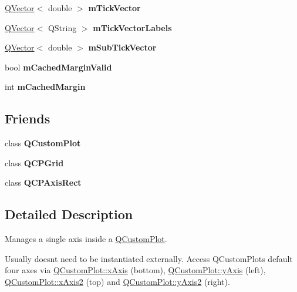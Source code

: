 \begin{DoxyCompactItemize}
\hyperlink{class_q_vector}{Q\+Vector}$<$ double $>$ {\bfseries m\+Tick\+Vector}
\item 
\mbox{\label{class_q_c_p_axis_ac9d1aeb1e401bd421d12848742d84fe2}} 
\hyperlink{class_q_vector}{Q\+Vector}$<$ Q\+String $>$ {\bfseries m\+Tick\+Vector\+Labels}
\item 
\mbox{\label{class_q_c_p_axis_a173cc7f7e9fe3c58e61ea4a5adb6f00a}} 
\hyperlink{class_q_vector}{Q\+Vector}$<$ double $>$ {\bfseries m\+Sub\+Tick\+Vector}
\item 
\mbox{\label{class_q_c_p_axis_a2cde37b6e385f47e11322df4ac1b0e9b}} 
bool {\bfseries m\+Cached\+Margin\+Valid}
\item 
\mbox{\label{class_q_c_p_axis_a48ace55cbd54f7241e7f1b06fd369b64}} 
int {\bfseries m\+Cached\+Margin}
\end{DoxyCompactItemize}
\subsection*{Friends}
\begin{DoxyCompactItemize}
\item 
\mbox{\label{class_q_c_p_axis_a00f8b42d059625f815808a7cc99c2f04}} 
class {\bfseries Q\+Custom\+Plot}
\item 
\mbox{\label{class_q_c_p_axis_aba5bcc293a6df1e0d98056ba3faf982b}} 
class {\bfseries Q\+C\+P\+Grid}
\item 
\mbox{\label{class_q_c_p_axis_a34deb2f894a2e4188ca024f20ccbefc1}} 
class {\bfseries Q\+C\+P\+Axis\+Rect}
\end{DoxyCompactItemize}


\subsection{Detailed Description}
Manages a single axis inside a \hyperlink{class_q_custom_plot}{Q\+Custom\+Plot}. 

Usually doesn\textquotesingle{}t need to be instantiated externally. Access Q\+Custom\+Plot\textquotesingle{}s default four axes via \hyperlink{class_q_custom_plot_a9a79cd0158a4c7f30cbc702f0fd800e4}{Q\+Custom\+Plot\+::x\+Axis} (bottom), \hyperlink{class_q_custom_plot_af6fea5679725b152c14facd920b19367}{Q\+Custom\+Plot\+::y\+Axis} (left), \hyperlink{class_q_custom_plot_ada41599f22cad901c030f3dcbdd82fd9}{Q\+Custom\+Plot\+::x\+Axis2} (top) and \hyperlink{class_q_custom_plot_af13fdc5bce7d0fabd640f13ba805c0b7}{Q\+Custom\+Plot\+::y\+Axis2} (right).

